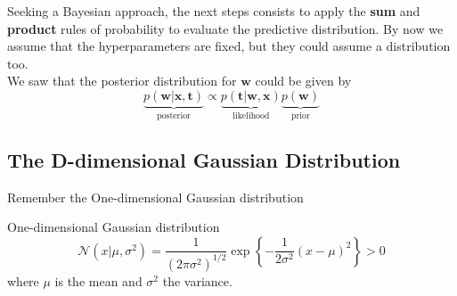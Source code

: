 	

\begin{frame}{\insertsection}
	Seeking a Bayesian approach, the next steps consists to apply the \textbf{sum} and \textbf{product} rules of probability to evaluate the predictive distribution. By now we assume that the hyperparameters are fixed, but they could assume a distribution too. \\
	\vspace{1em}
	We saw that the posterior distribution for $\mathbf{w}$ could be given by
	\begin{equation*}
		\underbrace{p\left( \mathbf{w} | \mathbf{x}, \mathbf{t} \right)}_{\text{posterior}} \propto \underbrace{p\left(  \mathbf{t} |\mathbf{w} ,\mathbf{x} \right)}_{\text{likelihood}}  \underbrace{p\left( \mathbf{w} \right)}_{\text{prior}}
	\end{equation*}

\end{frame}


\subsection{The D-dimensional Gaussian Distribution}

\begin{frame}{\insertsubsection}

Remember the One-dimensional Gaussian distribution
\begin{block}{One-dimensional Gaussian distribution}
\begin{equation*}
	\mathcal{N}(x | \mu, \sigma^2) = \frac{1}{(2 \pi \sigma^2)^{1/2}} \exp \left\{ -\frac{1}{2 \sigma^2} (x- \mu)^2 \right\} > 0
\end{equation*}
where $\mu$ is the mean and $\sigma^2$ the variance.
\end{block}
\end{frame}

